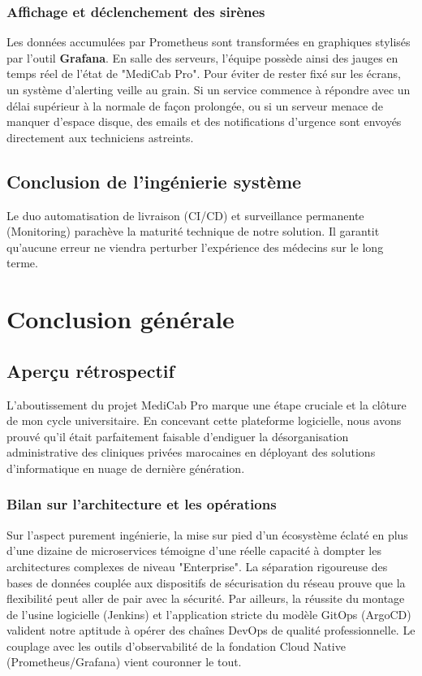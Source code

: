 \documentclass[final]{report}
\begin{document}
\subsection{Affichage et déclenchement des sirènes}
Les données accumulées par Prometheus sont transformées en graphiques stylisés par l'outil \textbf{Grafana}. En salle des serveurs, l'équipe possède ainsi des jauges en temps réel de l'état de "MediCab Pro".
Pour éviter de rester fixé sur les écrans, un système d'alerting veille au grain. Si un service commence à répondre avec un délai supérieur à la normale de façon prolongée, ou si un serveur menace de manquer d'espace disque, des emails et des notifications d'urgence sont envoyés directement aux techniciens astreints.
 
\section{Conclusion de l'ingénierie système}
Le duo automatisation de livraison (CI/CD) et surveillance permanente (Monitoring) parachève la maturité technique de notre solution. Il garantit qu'aucune erreur ne viendra perturber l'expérience des médecins sur le long terme.
 

\chapter*{Conclusion générale}
 
\section*{Aperçu rétrospectif}
L'aboutissement du projet MediCab Pro marque une étape cruciale et la clôture de mon cycle universitaire. En concevant cette plateforme logicielle, nous avons prouvé qu'il était parfaitement faisable d'endiguer la désorganisation administrative des cliniques privées marocaines en déployant des solutions d'informatique en nuage de dernière génération.
 
\subsection*{Bilan sur l'architecture et les opérations}
Sur l'aspect purement ingénierie, la mise sur pied d'un écosystème éclaté en plus d'une dizaine de microservices témoigne d'une réelle capacité à dompter les architectures complexes de niveau "Enterprise". La séparation rigoureuse des bases de données couplée aux dispositifs de sécurisation du réseau prouve que la flexibilité peut aller de pair avec la sécurité.
Par ailleurs, la réussite du montage de l'usine logicielle (Jenkins) et l'application stricte du modèle GitOps (ArgoCD) valident notre aptitude à opérer des chaînes DevOps de qualité professionnelle. Le couplage avec les outils d'observabilité de la fondation Cloud Native (Prometheus/Grafana) vient couronner le tout.
 
\end{document}
